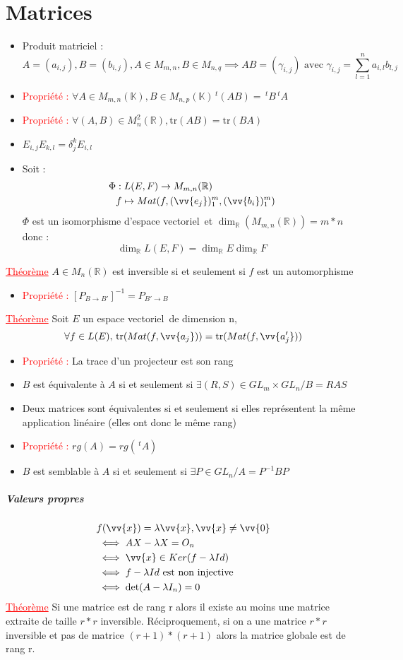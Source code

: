 \documentclass[a4paper, 11pts, french]{article}
\newcommand{\R}{\mathbb{R}}
\newcommand{\K}{\mathbb{K}}
\newcommand{\tr}{\mathrm{tr}}
\newcommand{\ev}{espace vectoriel}
\newcommand{\de}{\delta}
\newcommand{\la}{\lambda}
\newcommand{\som}[2]{\overset{#2}{\underset{#1}{\sum}}}
\newcommand{\thm}{\textcolor{red}{\underline{Théorème} }}
\newcommand{\ppt}{\textcolor{red}{Propriété : }}
\begin{document}
	\section{Matrices}
	\begin{itemize}
 		\item Produit matriciel :
			$$A=(a_{i,j}),B=(b_{i,j}), A\in M_{m,n}, B \in M_{n,q} \implies AB=(\gamma_{i,j}) \text{ avec } \gamma_{i,j}=\som{l=1}{n}a_{i,l}b_{l,j}$$
 		\item \ppt $\forall A \in M_{m,n}(\K), B \in M_{n,p}(\K) \, ^t(AB)=\, ^tB\, ^tA$
 		\item \ppt $\forall (A,B) \in M_n^2(\R), \tr(AB)=\tr(BA)$
 		\item $E_{i,j}E_{k,l}= \de_j^kE_{i,l}$
 		\item Soit :
			\begin{align*}
				\Phi &: L(E,F) \rightarrow M_{m,n}(\R) \\
				      &f \mapsto Mat(f,(\vv{e_j})_1^m,(\vv{b_i})_1^m)
			\end{align*}
			$\Phi$ est un isomorphisme d'\ev \, et $\dim_{\R}(M_{m,n}(\R))=m*n$ donc : $$\dim_{\R}L(E,F)=\dim_{\R}E \dim_{\R}F$$
	\end{itemize}
	 \thm $A\in M_n(\R)$ est inversible si et seulement si $f$ est un automorphisme

	\begin{itemize}
 		\item\ppt $[P_{B\rightarrow B'}]^{-1}=P_{B'\rightarrow B}$
	\end{itemize}
	 \thm Soit $E$ un \ev \, de dimension n, $$\forall f \in L(E), \, \tr(Mat(f,\vv{a_j}))=\tr(Mat(f,\vv{a'_j}))$$
	\begin{itemize}
 		\item \ppt La trace d'un projecteur est son rang
 		\item $B$ est équivalente à $A$ si et seulement si $\exists (R,S) \in GL_m \times GL_n / B=RAS$
 		\item Deux matrices sont équivalentes si et seulement si elles représentent la même application linéaire (elles ont donc le même rang)
 		\item \ppt $rg(A)=rg(\,^tA)$
 		\item $B$ est semblable à $A$ si et seulement si $\exists P \in GL_n / A=P^{-1}BP$
	\end{itemize}

	\subparagraph{Valeurs propres}
			\begin{align*}
				&f(\vv{x}) = \la \vv{x}, \vv{x}\neq \vv{0} \\
				&\iff AX-\la X=O_n\\
				&\iff \vv{x}\in Ker(f-\la Id) \\
				&\iff f-\la Id \text{ est non injective} \\
				&\iff \det(A-\la I_n)=0
			\end{align*}
	 \thm Si une matrice est de rang r alors il existe au moins une matrice extraite de taille $r*r$ inversible. Réciproquement, si on a une matrice $r*r$ inversible et pas de matrice $(r+1)*(r+1)$ alors la matrice globale est de rang r.
\end{document}
